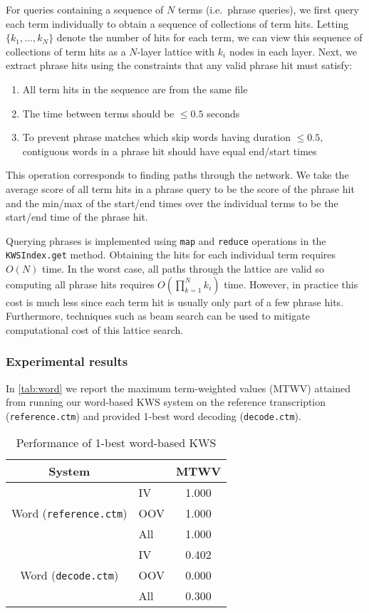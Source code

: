 \documentclass[a4paper,oneside,reqno]{amsart}
\begin{document}
For queries containing a sequence of $N$ terms (i.e.\ phrase queries), we first
query each term individually to obtain a sequence of collections of term hits.
Letting $\{k_1, \ldots,k_N\}$ denote the number of hits for each term, we can
view this sequence of collections of term hits as a $N$-layer lattice with $k_i$
nodes in each layer.  Next, we extract phrase hits using the constraints that
any valid phrase hit must satisfy:
\begin{enumerate}
  \item All term hits in the sequence are from the same file
  \item The time between terms should be $\leq 0.5$ seconds
  \item To prevent phrase matches which skip words having duration $\leq 0.5$, contiguous
    words in a phrase hit should have equal end/start times
\end{enumerate}
This operation corresponds to finding paths through the network. We take the
average score of all term hits in a phrase query to be the score of the phrase
hit and the min/max of the start/end times over the individual terms to be
the start/end time of the phrase hit.

Querying phrases is implemented using \texttt{map} and \texttt{reduce} %
operations in the \texttt{KWSIndex.get} method. Obtaining the hits for each
individual term requires $O(N)$ time. In the worst case, all paths through the
lattice are valid so computing all phrase hits requires $O(\prod_{k=1}^N k_i)$
time. However, in practice this cost is much less since each term hit is
usually only part of a few phrase hits. Furthermore, techniques such as beam
search can be used to mitigate computational cost of this lattice search.

\subsubsection{Experimental results}

In \autoref{tab:word} we report the maximum term-weighted values (MTWV) attained
from running our word-based KWS system on the reference transcription
(\texttt{reference.ctm}) and provided 1-best word decoding
(\texttt{decode.ctm}).

\begin{table}[ht!]
  \begin{tabular}{clc}
    \toprule
    System & & MTWV \\
    \midrule
    \multirow{3}{*}{Word (\texttt{reference.ctm})}
      & IV & 1.000 \\
      & OOV & 1.000 \\
      & All & 1.000 \\
    \multirow{3}{*}{Word (\texttt{decode.ctm})}
      & IV & 0.402 \\
      & OOV & 0.000 \\
      & All & 0.300 \\
    \bottomrule
  \end{tabular}
  \caption{Performance of 1-best word-based KWS}
  \label{tab:word}
\end{table}
\end{document}
